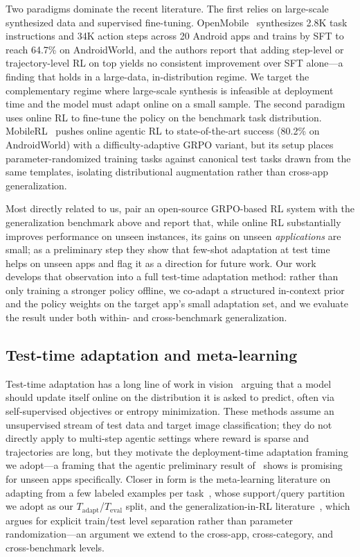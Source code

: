 Two paradigms dominate the recent literature. The first relies on large-scale
synthesized data and supervised fine-tuning. OpenMobile~\citep{openmobile2026}
synthesizes 2.8K task instructions and 34K action steps across 20 Android apps
and trains by SFT to reach 64.7\% on AndroidWorld, and the authors report that
adding step-level or trajectory-level RL on top yields no consistent improvement
over SFT alone---a finding that holds in a large-data, in-distribution regime. We
target the complementary regime where large-scale synthesis is infeasible at
deployment time and the model must adapt online on a small sample. The second
paradigm uses online RL to fine-tune the policy on the benchmark task
distribution. MobileRL~\citep{mobilerl2025} pushes online agentic RL to
state-of-the-art success (80.2\% on AndroidWorld) with a difficulty-adaptive
GRPO variant, but its setup places parameter-randomized training tasks against
canonical test tasks drawn from the same templates, isolating distributional
augmentation rather than cross-app generalization.

Most directly related to us, \citet{gu2026generalization} pair an open-source
GRPO-based RL system with the generalization benchmark above and report that,
while online RL substantially improves performance on unseen instances, its gains
on unseen \emph{applications} are small; as a preliminary step they show that
few-shot adaptation at test time helps on unseen apps and flag it as a direction
for future work. Our work develops that observation into a full test-time
adaptation method: rather than only training a stronger policy offline, we
co-adapt a structured in-context prior and the policy weights on the target app's
small adaptation set, and we evaluate the result under both within- and
cross-benchmark generalization.

\subsection{Test-time adaptation and meta-learning}

Test-time adaptation has a long line of work in vision~\citep{sun2020ttt,wang2021tent}
arguing that a model should update itself online on the distribution it is asked
to predict, often via self-supervised objectives or entropy minimization. These
methods assume an unsupervised stream of test data and target image
classification; they do not directly apply to multi-step agentic settings where
reward is sparse and trajectories are long, but they motivate the
deployment-time adaptation framing we adopt---a framing that the agentic
preliminary result of~\citet{gu2026generalization} shows is promising for unseen
apps specifically. Closer in form is the meta-learning literature on adapting
from a few labeled examples per task~\citep{finn2017maml}, whose support/query
partition we adopt as our $T_{\text{adapt}}$/$T_{\text{eval}}$ split, and the
generalization-in-RL literature~\citep{cobbe2020procgen}, which argues for
explicit train/test level separation rather than parameter randomization---an
argument we extend to the cross-app, cross-category, and cross-benchmark levels.

